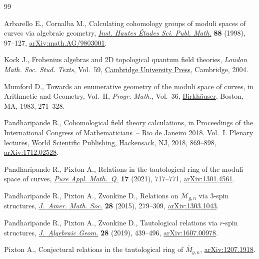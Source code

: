 \documentclass[10pt,a4paper]{amsart}
\numberwithin{equation}{section}
\begin{document}
\begin{thebibliography}{99}
\footnotesize\itemsep=0pt

Arbarello E., Cornalba M., Calculating cohomology groups of moduli spaces of
 curves via algebraic geometry, \href{https://doi.org/10.1007/BF02701767}{\textit{Inst. Hautes \'Etudes Sci. Publ.
 Math.}} \textbf{88} (1998), 97--127, \href{https://arxiv.org/abs/math.AG/9803001}{arXiv:math.AG/9803001}.

Kock J., Frobenius algebras and 2{D} topological quantum field theories,
 \textit{London Math. Soc. Stud. Texts}, Vol.~59, \href{https://doi.org/10.1017/CBO9780511615443}{Cambridge University Press},
 Cambridge, 2004.

Mumford D., Towards an enumerative geometry of the moduli space of curves, in
 Arithmetic and {G}eometry, {V}ol.~{II}, \textit{Progr. Math.}, Vol.~36,
 \href{https://doi.org/10.1007/978-1-4757-9286-7_12}{Birkh\"auser}, Boston, MA, 1983, 271--328.

Pandharipande R., Cohomological field theory calculations, in Proceedings of
 the {I}nternational {C}ongress of {M}athematicians~-- {R}io de {J}aneiro
 2018. {V}ol.~{I}. {P}lenary lectures,\href{https://doi.org/10.1142/9789813272880_0031}{ World Scientific Publishing},
 Hackensack, NJ, 2018, 869--898, \href{https://arxiv.org/abs/1712.02528}{arXiv:1712.02528}.

Pandharipande R., Pixton A., Relations in the tautological ring of the moduli
 space of curves, \href{https://doi.org/10.4310/PAMQ.2021.v17.n2.a7}{\textit{Pure Appl. Math.~Q.}} \textbf{17} (2021), 717--771,
 \href{https://arxiv.org/abs/1301.4561}{arXiv:1301.4561}.

Pandharipande R., Pixton A., Zvonkine D., Relations on {$\overline{\mathcal
 M}_{g,n}$} via {$3$}-spin structures, \href{https://doi.org/10.1090/S0894-0347-2014-00808-0}{\textit{J.~Amer. Math. Soc.}}
 \textbf{28} (2015), 279--309, \href{https://arxiv.org/abs/1303.1043}{arXiv:1303.1043}.

Pandharipande R., Pixton A., Zvonkine D., Tautological relations via {$r$}-spin
 structures, \href{https://doi.org/10.1090/jag/736}{\textit{J.~Algebraic Geom.}} \textbf{28} (2019), 439--496,
 \href{https://arxiv.org/abs/1607.00978}{arXiv:1607.00978}.

Pixton A., Conjectural relations in the tautological ring of
 $\overline{M}_{g,n}$, \href{https://arxiv.org/abs/1207.1918}{arXiv:1207.1918}.


\end{thebibliography}
\end{document}
